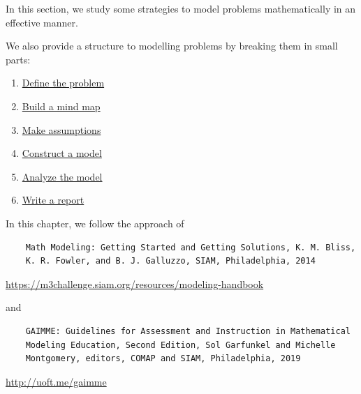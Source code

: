 
%
%


\begin{topic}

\label{chap1}
In this section, we study some strategies to model problems mathematically in an effective manner.

We also provide a structure to modelling problems by breaking them in small parts:

\begin{enumerate}[label={\bf \arabic*.}]
	\item \hyperref[moddefine]{Define the problem}
	\item \hyperref[mindmap]{Build a mind map}
	\item \hyperref[assumption]{Make assumptions}
	\item \hyperref[model]{Construct a model}
	\item \hyperref[analysis]{Analyze the model}
	\item \hyperref[report]{Write a report}
\end{enumerate}

\vspace{1cm}

In this chapter, we follow the approach of 
\begin{graybox}
\begin{minipage}{.8\textwidth}
\begin{verbatim}
	Math Modeling: Getting Started and Getting Solutions, K. M. Bliss, 
	K. R. Fowler, and B. J. Galluzzo, SIAM, Philadelphia, 2014
\end{verbatim}
\begin{center}
\url{https://m3challenge.siam.org/resources/modeling-handbook}
\end{center}
\end{minipage}
\hfill
\begin{minipage}{.17\textwidth}
	\hfill{}	
\end{minipage}
\end{graybox}
and
\begin{graybox}
\begin{minipage}{.8\textwidth}
\begin{verbatim}
	GAIMME: Guidelines for Assessment and Instruction in Mathematical
	Modeling Education, Second Edition, Sol Garfunkel and Michelle
	Montgomery, editors, COMAP and SIAM, Philadelphia, 2019
\end{verbatim}
\begin{center}
\url{http://uoft.me/gaimme}
\end{center}
\end{minipage}
\hfill
\begin{minipage}{.17\textwidth}
	\hfill{}	
\end{minipage}
\end{graybox}



\end{topic}
